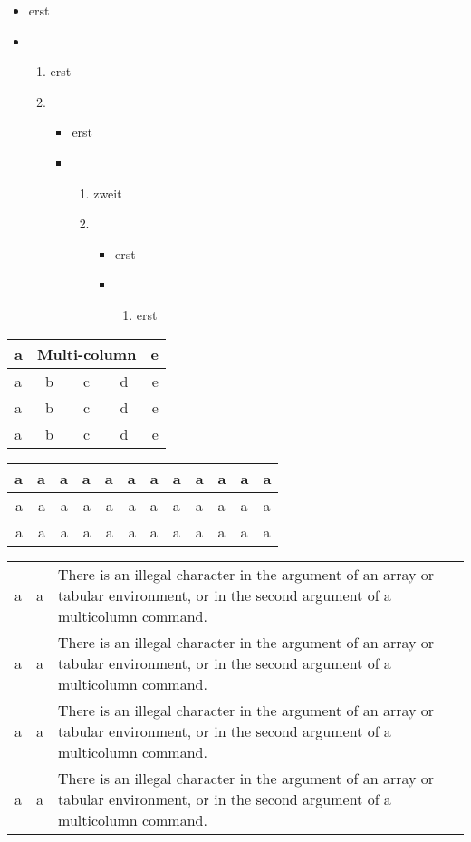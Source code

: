 \documentclass{article}
\begin{document}
\begin{itemize}
\item erst
\item
  \begin{enumerate}
  \item erst
  \item
    \begin{itemize}
    \item erst
    \item
      \begin{enumerate}
      \item zweit
      \item
        \begin{itemize}
        \item erst
        \item
          \begin{enumerate}
          \item erst
          \end{enumerate}
        \end{itemize}
      \end{enumerate}
    \end{itemize}
  \end{enumerate}
\end{itemize}

\begin{tabular}{|l|c|c|c|r|}
  a & \multicolumn{3}{c}{Multi-column}  & e \\
  \hline
  a & b & c & d & e \\
  a & b & c & d & e \\
  a & b & c & d & e
\end{tabular}

\begin{tabular}{*{6}{r}*{6}{l}}
  a &a &a &a&a&a&a&a&a&a&a&a \\
  \hline
  a &a &a &a&a&a&a&a&a&a&a&a \\
  a &a &a &a&a&a&a&a&a&a&a&a \\
\end{tabular}

\begin{tabular}{c c m{5cm}}
  a & a & There is an illegal character in the argument of an
          array or tabular environment, or in the second argument of a multicolumn command. \\
  a & a & There is an illegal character in the argument of an
          array or tabular environment, or in the second argument of a multicolumn command. \\
  a & a & There is an illegal character in the argument of an
          array or tabular environment, or in the second argument of a multicolumn command. \\
  a & a & There is an illegal character in the argument of an
          array or tabular environment, or in the second argument of a multicolumn command. \\
\end{tabular}
\end{document}
